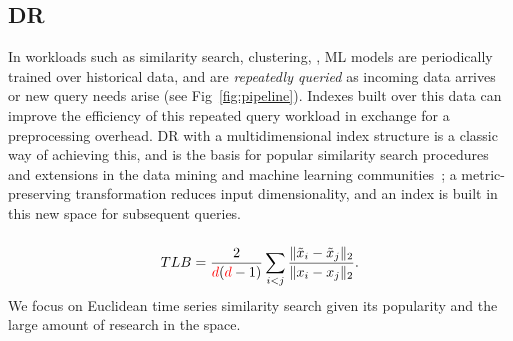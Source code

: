 \subsection{DR }

In workloads such as similarity search, clustering, , ML models are periodically trained over historical data, and are \emph{repeatedly queried} as incoming data arrives or new query needs arise (see Fig~\ref{fig:pipeline}). 
Indexes built over this data can improve the efficiency of this repeated query workload in exchange for a preprocessing overhead.
DR with a multidimensional index structure is a classic way of achieving this, and is the basis for popular similarity search procedures and extensions in the data mining and machine learning communities~\cite{keogh-indexing,local-dr,charu-ss,dynamic-ss,dm-book,humming-index,decade,search}; a metric-preserving transformation reduces input dimensionality, and an index is built in this new space for subsequent queries.


\subsubsection*{}
\begin{equation}
\label{eq:tlb}
TLB = \frac{2}{{\color{red}d}({\color{red}d}-1)}\sum_{i<j}\frac{\| \tilde{x}_i -  \tilde{x}_j \|_2 }{\| x_i -  x_j\|_2 }.
\end{equation}
We focus on Euclidean time series similarity search  given its popularity and the large amount of research in the space.%



